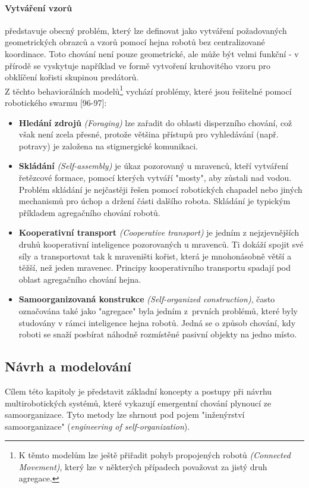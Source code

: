 \documentclass[a4paper,12pt]{article}
\begin{document}
\paragraph{Vytváření vzorů} představuje obecný problém, který lze definovat jako vytváření
požadovaných geometrických obrazců a vzorů pomocí hejna robotů bez centralizované koordinace.
Toto chování není pouze geometrické, ale může být velmi funkční - v přírodě se vyskytuje například
ve formě vytvoření kruhovitého vzoru pro obklíčení kořisti skupinou predátorů.\\

Z těchto behaviorálních modelů\footnote{K těmto modelům lze ještě přiřadit pohyb propojených
robotů {\it (Connected Movement)}, který lze v některých případech považovat za jistý druh agregace.}
vychází problémy, které jsou řešitelné pomocí robotického swarmu \cite{Blum08SwarmInt}[96-97]:
\begin{itemize}
  \item {\bf Hledání zdrojů} {\it (Foraging)} lze zařadit do oblasti disperzního chování,
    což však není zcela přesné, protože většina přístupů pro vyhledávání (např. potravy)
    je založena na stigmergické komunikaci.
  \item {\bf Skládání} {\it (Self-assembly)} je úkaz pozorovaný u mravenců, kteří vytváření
    řetězcové formace, pomocí kterých vytváří "mosty", aby zůstali nad vodou. Problém skládání
    je nejčastěji řešen pomocí robotických chapadel nebo jiných mechanismů pro úchop a držení
    části dalšího robota. Skládání je typickým příkladem agregačního chování robotů.
  \item {\bf Kooperativní transport} {\it (Cooperative transport)} je jedním z nejzjevnějších
    druhů kooperativní inteligence pozorovaných u mravenců. Ti dokáží spojit své síly a
    transportovat tak k mraveništi kořist, která je mnohonásobně větší a těžší, než jeden
    mravenec. Principy kooperativního transportu spadají pod oblast agregačního chování hejna.
  \item {\bf Samoorganizovaná konstrukce} {\it (Self-organized construction)}, často označována
    také jako "agregace" byla jedním z~prvních problémů, které byly studovány v rámci inteligence
    hejna robotů. Jedná se o způsob chování, kdy roboti se snaží posbírat náhodně rozmístěné
    pasivní objekty na jedno místo.
\end{itemize}


\subsection{Návrh a modelování}
Cílem této kapitoly je představit základní koncepty a postupy při návrhu multirobotických
systémů, které vykazují emergentní chování plynoucí ze samoorganizace. Tyto metody lze
shrnout pod pojem "inženýrství samoorganizace" ({\it engineering of self-organization}).
\end{document}
